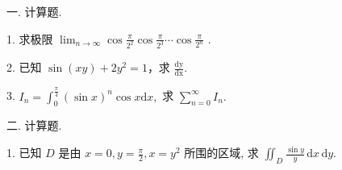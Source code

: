 \documentclass{examcollection}
\begin{document}
{\begin{minipage}{\textwidth}
\smallskip
一. 计算题.\par
1. 求极限  $\lim_{n\to\infty}\cos\frac{\pi}{2^{2}}\cos\frac{\pi}{2^{3}}\cdots\cos\frac{\pi}{2^{n}}$ .\par
2. 已知 $\sin (xy) + 2y^2 = 1$，求 $\frac{\mathrm{dy}}{\mathrm{dx}}$.\par
3. $I_{n} = \int_{0}^{\frac{\pi}{4}}(\sin x)^{n}\cos x\mathrm{d}x,$ 求 $\sum_{n = 0}^{\infty}I_n.$\par
二. 计算题.\par
1. 已知 $D$ 是由 $x = 0, y = \frac{\pi}{2}, x = y^2$ 所围的区域, 求 $\iint_{D} \frac{\sin y}{y} \, \mathrm{d}x \, \mathrm{d}y$.\par
\end{minipage}}
\ifdim\dimexpr\ht\proofbox+\dp\proofbox\relax>\textheight
\noindent\resizebox{!}{\textheight}{\usebox{\proofbox}}\else\noindent\usebox{\proofbox}\fi\clearpage
\end{document}
